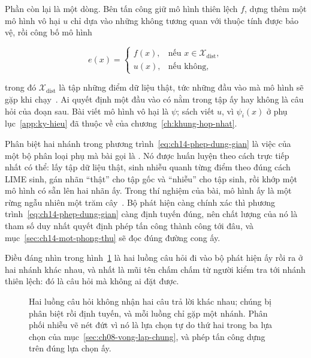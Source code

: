 Phần còn lại là một dòng. Bên tấn công giữ mô hình thiên lệch $f$, dựng thêm
một mô hình vô hại $u$ chỉ dựa vào những  không tương
quan với thuộc tính được bảo vệ, rồi công bố mô hình

\begin{equation}
\label{eq:ch14-phep-dung-gian}
e(x) =
\begin{cases}
f(x), & \text{nếu } x \in \mathcal{X}_{\mathrm{dist}},\\
u(x), & \text{nếu không,}
\end{cases}
\end{equation}

trong đó $\mathcal{X}_{\mathrm{dist}}$ là tập những điểm dữ liệu thật, tức
những đầu vào mà mô hình sẽ gặp khi chạy~\autocite{mfooling}. Ai quyết định một
đầu vào có nằm trong tập ấy hay không là câu hỏi của đoạn sau. Bài viết mô hình
vô hại là $\psi$; sách viết $u$, vì $\psi_i(x)$ ở phụ lục~\ref{app:ky-hieu} đã
thuộc về  của
chương~\ref{ch:khung-hop-nhat}.

%
Phân biệt hai nhánh trong phương trình~\ref{eq:ch14-phep-dung-gian} là việc của
một bộ phân loại phụ mà bài gọi là
. Nó được huấn
luyện theo cách trực tiếp nhất có thể: lấy tập dữ liệu thật, sinh nhiễu quanh
từng điểm theo đúng cách LIME sinh, gán nhãn \enquote{thật} cho tập gốc và
\enquote{nhiễu} cho tập sinh, rồi khớp một mô hình có sẵn lên hai nhãn ấy. Trong
thí nghiệm của bài, mô hình ấy là một rừng ngẫu nhiên một trăm
cây~\autocite{mfooling}. Bộ phát hiện càng chính xác thì phương
trình~\ref{eq:ch14-phep-dung-gian} càng định tuyến đúng, nên chất lượng của nó
là tham số duy nhất quyết định phép tấn công thành công tới đâu, và
mục~\ref{sec:ch14-mot-phong-thu} sẽ đọc đúng đường cong ấy.

Điều đáng nhìn trong hình~\ref{fig:ch14-phep-dung-gian} là hai luồng câu hỏi đi
vào bộ phát hiện ấy rồi ra ở hai nhánh khác nhau, và nhất là mũi tên chấm chấm
từ người kiểm tra tới nhánh thiên lệch: đó là câu hỏi mà không ai đặt được.

\begin{figure}[htbp]
\centering

\caption{Hai luồng câu hỏi không nhận hai câu trả lời khác nhau; chúng bị
phân biệt rồi định tuyến, và mỗi luồng chỉ gặp một nhánh. Phân phối nhiễu vẽ
nét đứt vì nó là lựa chọn tự do thứ hai trong ba lựa chọn của
mục~\ref{sec:ch08-vong-lap-chung}, và phép tấn công dựng trên đúng lựa chọn
ấy.}
\label{fig:ch14-phep-dung-gian}
\end{figure}

